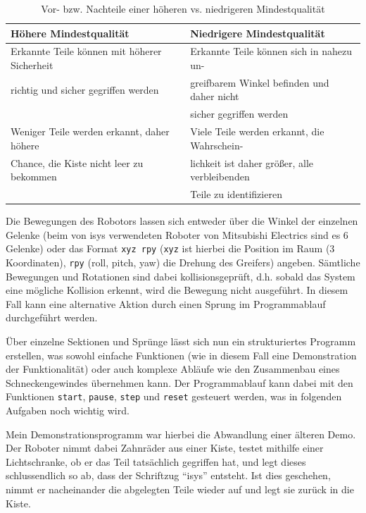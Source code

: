 \documentclass[xcolor=dvipsnames,11pt,paper=a4paper]{report}
\begin{document}
\begin{table}[H]
	\begin{tabular}{| l || l |}
	\hline
	\textbf{Höhere Mindestqualität} & \textbf{ Niedrigere Mindestqualität}\\
	\hline\hline
	Erkannte Teile können mit höherer Sicherheit & Erkannte Teile können sich in nahezu un-\\
	richtig und sicher gegriffen werden & greifbarem Winkel befinden und daher nicht\\
	& sicher gegriffen werden\\
	\hline
	Weniger Teile werden erkannt, daher höhere & Viele Teile werden erkannt, die Wahrschein-\\
	Chance, die Kiste nicht leer zu bekommen & lichkeit ist daher größer, alle verbleibenden\\
	& Teile zu identifizieren\\
	\hline
	\end{tabular}
	\caption{Vor- bzw. Nachteile einer höheren vs. niedrigeren Mindestqualität}
	\label{mikado-demo-mindestqualität}
\end{table}

Die Bewegungen des Robotors lassen sich entweder über die Winkel der einzelnen Gelenke
(beim von isys verwendeten Roboter von Mitsubishi Electrics sind es 6 Gelenke) oder
das Format \texttt{xyz rpy} (\texttt{xyz} ist hierbei die Position im Raum (3 Koordinaten),
\texttt{rpy} (roll, pitch, yaw) die Drehung des Greifers) angeben. Sämtliche Bewegungen
und Rotationen sind dabei kollisionsgeprüft, d.h. sobald das System eine mögliche
Kollision erkennt, wird die Bewegung nicht ausgeführt. In diesem Fall kann eine
alternative Aktion durch einen Sprung im Programmablauf durchgeführt werden.

Über einzelne Sektionen und Sprünge lässt sich nun ein strukturiertes Programm erstellen,
was sowohl einfache Funktionen (wie in diesem Fall eine Demonstration der Funktionalität)
oder auch komplexe Abläufe wie den Zusammenbau eines Schneckengewindes übernehmen
kann. Der Programmablauf kann dabei mit den Funktionen \texttt{start}, \texttt{pause},
\texttt{step} und \texttt{reset} gesteuert werden, was in folgenden Aufgaben noch
wichtig wird.

Mein Demonstrationsprogramm war hierbei die Abwandlung einer älteren Demo. Der Roboter
nimmt dabei Zahnräder aus einer Kiste, testet mithilfe einer Lichtschranke, ob er
das Teil tatsächlich gegriffen hat, und legt dieses schlussendlich so ab, dass der
Schriftzug ``isys'' entsteht. Ist dies geschehen, nimmt er nacheinander die abgelegten
Teile wieder auf und legt sie zurück in die Kiste.
\end{document}
